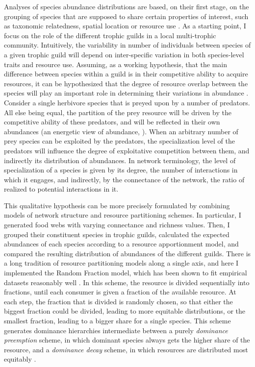 Analyses of species abundance distributions are based, on their first stage, on the grouping of species that are supposed to share certain properties of interest, such as taxonomic relatedness, spatial location or resource use \citep{Fauth1996}. As a starting point, I focus on the role of the different trophic guilds in a local multi-trophic community. Intuitively, the variability in number of individuals between species of a given trophic guild will depend on inter-specific variation in both species-level traits and resource use. Assuming, as a working hypothesis, that the main difference between species within a guild is in their competitive ability to acquire resources, it can be hypothesized that the degree of resource overlap between the species will play an important role in determining their variations in abundance \citep{Sugihara2003}. Consider a single herbivore species that is preyed upon by a number of predators. All else being equal, the partition of the prey resource will be driven by the competitive ability of these predators, and will be reflected in their own abundances (an energetic view of abundance, \citealt{Isaac2013}). When an arbitrary number of prey species can be exploited by the predators, the specialization level of the predators will influence the degree of exploitative competition between them, and indirectly its distribution of abundances. In network terminology, the level of specialization of a species is given by its degree, the number of interactions in which it engages, and indirectly, by the connectance of the network, the ratio of realized to potential interactions in it.

This qualitative hypothesis can be more precisely formulated by combining models of network structure and resource partitioning schemes. In particular, I generated food webs with varying connectance and richness values. Then, I grouped their constituent species in trophic guilds, calculated the expected abundances of each species according to a resource apportionment model, and compared the resulting distribution of abundances of the different guilds. There is a long tradition of resource partitioning models along a single axis, and here I implemented the Random Fraction model, which has been shown to fit empirical datasets reasonably well \citep{Tokeshi1990}. In this scheme, the resource is divided sequentially into fractions, until each consumer is given a fraction of the available resource. At each step, the fraction that is divided is randomly chosen, so that either the biggest fraction could be divided, leading to more equitable distributions, or the smallest fraction, leading to a bigger share for a single species. This scheme generates dominance hierarchies intermediate between a purely \textit{dominance preemption} scheme, in which dominant species always gets the higher share of the resource, and a \textit{dominance decay} scheme, in which resources are distributed most equitably \citep{Tokeshi1990}.

